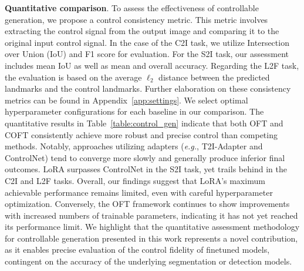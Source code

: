 \textbf{Quantitative comparison}. To assess the effectiveness of controllable generation, we propose a control consistency metric. This metric involves extracting the control signal from the output image and comparing it to the original input control signal. In the case of the C2I task, we utilize Intersection over Union (IoU) and F1 score for evaluation. For the S2I task, our assessment includes mean IoU as well as mean and overall accuracy. Regarding the L2F task, the evaluation is based on the average $\ell_2$ distance between the predicted landmarks and the control landmarks. Further elaboration on these consistency metrics can be found in Appendix~\ref{app:settings}. We select optimal hyperparameter configurations for each baseline in our comparison. The quantitative results in Table~\ref{table:control_gen} indicate that both OFT and COFT consistently achieve more robust and precise control than competing methods. Notably, approaches utilizing adapters (\emph{e.g.}, T2I-Adapter and ControlNet) tend to converge more slowly and generally produce inferior final outcomes. LoRA surpasses ControlNet in the S2I task, yet trails behind in the C2I and L2F tasks. Overall, our findings suggest that LoRA's maximum achievable performance remains limited, even with careful hyperparameter optimization. Conversely, the OFT framework continues to show improvements with increased numbers of trainable parameters, indicating it has not yet reached its performance limit. We highlight that the quantitative assessment methodology for controllable generation presented in this work represents a novel contribution, as it enables precise evaluation of the control fidelity of finetuned models, contingent on the accuracy of the underlying segmentation or detection models.

